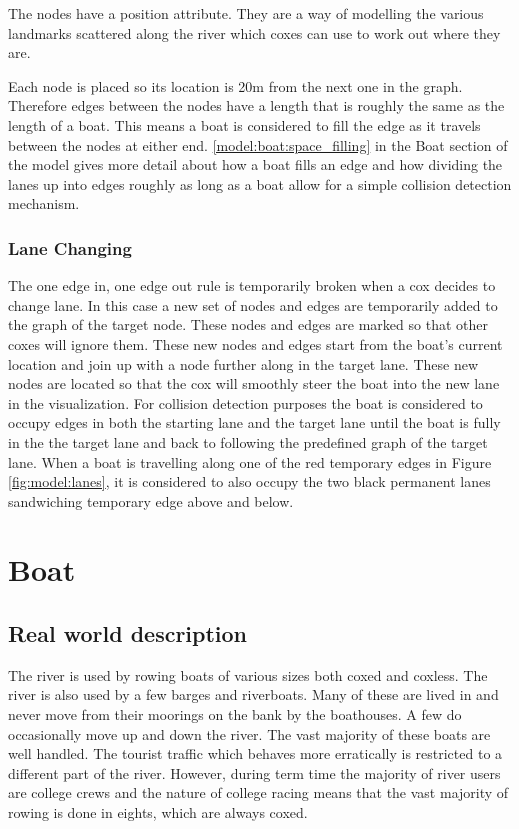       The nodes have a position attribute. They are a way of modelling the various landmarks scattered along the river which coxes can use to work out where they are.
      
      Each node is placed so its location is 20m from the next one in the graph. Therefore edges between the nodes have a length that is roughly the same as the length of a boat. This means a boat is considered to fill the edge as it travels between the nodes at either end. \ref{model:boat:space_filling} in the Boat section of the model  gives more detail about how a boat fills an edge and how dividing the lanes up into edges roughly as long as a boat allow for a simple collision detection mechanism.
      
      \subsubsection{Lane Changing} \label{model:river:lane_changing}
      The one edge in, one edge out rule is temporarily broken when a cox decides to change lane. In this case a new set of nodes and edges are temporarily added to the graph of the target node. These nodes and edges are marked so that other coxes will ignore them. These new nodes and edges start from the boat's current location and join up with a node further along in the target lane. These new nodes are located so that the cox will smoothly steer the boat into the new lane in the visualization. For collision detection purposes the boat is considered to occupy edges in both the starting lane and the target lane until the boat is fully in the the target lane and back to following the predefined graph of the target lane. When a boat is travelling along one of the red temporary edges in Figure \ref{fig:model:lanes}, it is considered to also occupy the two black permanent lanes sandwiching temporary edge above and below.

    \section{Boat}
      \subsection{Real world description}
      The river is used by rowing boats of various sizes both coxed and coxless. The river is also used by a few barges and riverboats. Many of these are lived in and never move from their moorings on the bank by the boathouses. A few do occasionally move up and down the river. The vast majority of these boats are well handled. The tourist traffic which behaves more erratically is restricted to a different part of the river. However, during term time the majority of river users are college crews and the nature of college racing means that the vast majority of rowing is done in eights, which are always coxed.
      
